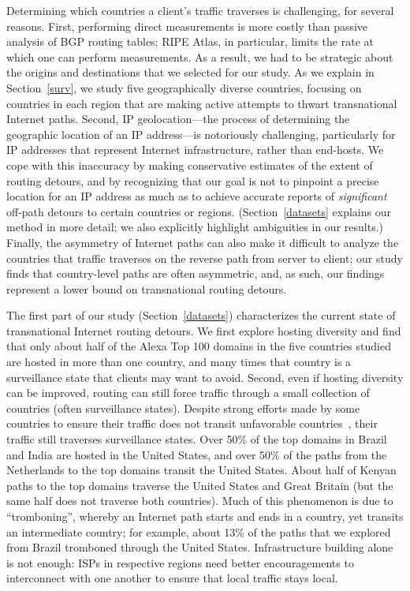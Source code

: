 Determining which countries a client's traffic traverses is challenging, for
several reasons.  First, performing direct measurements is more costly
than passive analysis of BGP routing tables; RIPE Atlas, in particular,
limits the rate at which one can perform measurements.  As a result, we
had to be strategic about the origins and destinations that we selected
for our study. As we explain in Section~\ref{surv}, we study five
geographically diverse countries, 
focusing on countries in each region that are
making active attempts to thwart transnational Internet paths.  Second,
IP geolocation---the process of determining the geographic location of an
IP address---is notoriously challenging, particularly for IP addresses
that represent Internet infrastructure, rather than end-hosts. We cope
with this inaccuracy by making conservative estimates of the extent of
routing detours, and by recognizing that our goal is not to pinpoint a
precise location for an IP address as much as to achieve accurate
reports of {\em significant} off-path detours to certain countries or
regions. (Section~\ref{datasets} explains our method in more detail; we
also explicitly highlight ambiguities in our results.) Finally, the
asymmetry of Internet paths can also make it difficult to analyze the
countries that traffic traverses on the reverse path from server to
client; our study finds that country-level paths are often asymmetric,
and, as such, our findings represent a lower bound on transnational
routing detours.

The first part of our study (Section~\ref{datasets}) characterizes the
current state of transnational Internet routing detours.  We first
explore hosting diversity and find that only about half of the Alexa Top
100 domains in the five countries studied are hosted in more than one
country, and many times that country is a surveillance state that
clients may want to avoid. Second, even if hosting diversity can be
improved, routing can still force traffic through a small
collection of countries (often surveillance states). Despite strong
efforts made by some countries to ensure their traffic does not transit
unfavorable countries~\cite{brazil_history, brazil_break_from_US,
  brazil_conference, brazil_conference2, brazil_human_rights}, their
traffic still traverses surveillance states.  Over 50\% of the top
domains in Brazil and India are hosted in the United States, and over
50\% of the paths from the Netherlands to the top domains transit the
United States.  About half of Kenyan paths to the top domains traverse
the United States and Great Britain (but the same half does not traverse
both countries).  Much of this phenomenon is due to ``tromboning'',
whereby an Internet path starts and ends in a country, yet transits an
intermediate country; for example, about 13\% of the paths that we
explored from Brazil tromboned through the United States.
Infrastructure building alone is not enough: ISPs in respective regions
need better encouragements to interconnect with one another to ensure
that local traffic stays local.

